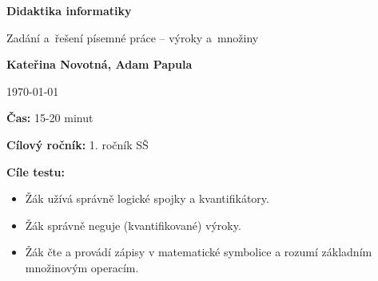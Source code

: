 \documentclass[12pt,a4paper,addpoints]{exam}
\def\maintitle{Didaktika informatiky}
\def\subtitle{Zadání a~řešení písemné práce -- výroky a~množiny}
\def\authorname{Kateřina Novotná, Adam Papula}
\begin{document}
    \begin{titlepage}
        \begin{center}
            \Large\textbf{{\maintitle}}

            \normalsize
            \vspace{0.5cm}
                \subtitle
            \vspace{1.5cm}
            
            \textbf{\authorname}
            \vspace{1.5cm}

            \today
            \vfill
            
            \raggedright
                \textbf{Čas:} 15-20 minut

                \textbf{Cílový ročník:} 1. ročník SŠ
                
                \textbf{Cíle testu:}    
                        \vspace{-5mm}
                        \footnotesize
                        \begin{itemize}[noitemsep,topsep=0pt]
                                \item Žák užívá správně logické spojky a kvantifikátory. 
                                \item Žák správně neguje (kvantifikované) výroky. 
                                \item Žák čte a provádí zápisy v matematické symbolice a rozumí základním množinovým operacím.
                        \end{itemize}


\end{center}
\end{titlepage}
\end{document}
